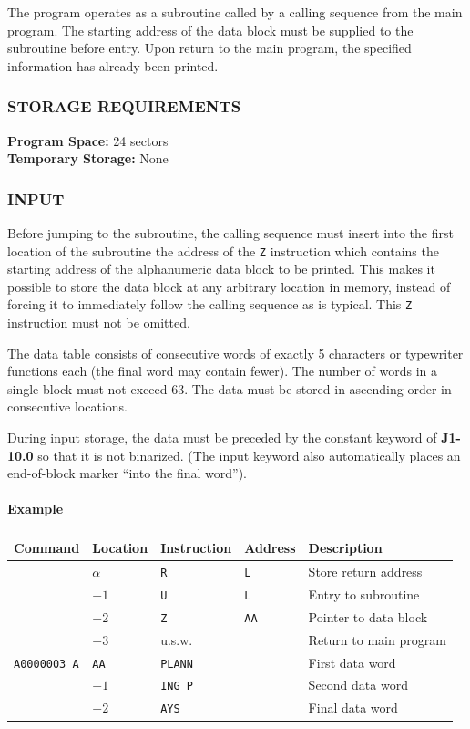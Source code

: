The program operates as a subroutine called by a calling sequence from the main program. The starting address of the data block must be supplied to the subroutine before entry. Upon return to the main program, the specified information has already been printed.

\subsubsection*{STORAGE REQUIREMENTS}
\textbf{Program Space:} 24 sectors \\
\textbf{Temporary Storage:} None

\subsubsection*{INPUT}
Before jumping to the subroutine, the calling sequence must insert into the first location of the subroutine the address of the \texttt{Z} instruction which contains the starting address of the alphanumeric data block to be printed. This makes it possible to store the data block at any arbitrary location in memory, instead of forcing it to immediately follow the calling sequence as is typical. This \texttt{Z} instruction must not be omitted.

The data table consists of consecutive words of exactly 5 characters or typewriter functions each (the final word may contain fewer). The number of words in a single block must not exceed 63. The data must be stored in ascending order in consecutive locations. 

During input storage, the data must be preceded by the constant keyword of \textbf{J1-10.0} so that it is not binarized. (The input keyword also automatically places an end-of-block marker ``into the final word'').

\paragraph{Example}
\begin{center}
\small
\begin{tabular}{lllll}
    \toprule
    \textbf{Command} & \textbf{Location} & \textbf{Instruction} & \textbf{Address} & \textbf{Description} \\
    \midrule
    & $\alpha$ & \texttt{R} & \texttt{L}  & Store return address \\
    & $+1$     & \texttt{U} & \texttt{L}  & Entry to subroutine \\
    & $+2$     & \texttt{Z} & \texttt{AA} & Pointer to data block \\
    & $+3$     & u.s.w.     &             & Return to main program \\
    [1ex]
    \texttt{A0000003 A} & \texttt{AA} & \texttt{PLANN} & & First data word \\
    & $+1$     & \texttt{ING P} & & Second data word \\
    & $+2$     & \texttt{AYS}   & & Final data word \\
    \bottomrule
\end{tabular}
\end{center}

